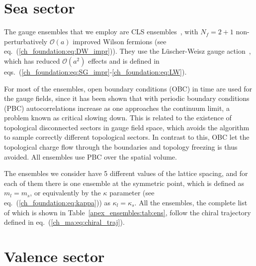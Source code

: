 
\section{Sea sector}
\label{ch_ma:sec:Sea}

The gauge ensembles that we employ are CLS ensembles~\citep{Bruno:2014jqa},\citep{Mohler:2017wnb} with $N_f=2+1$ non-perturbatively $\mathcal{O}(a)$ improved Wilson fermions (see eq.~(\ref{ch_foundation:eq:DW_impr})). They use the Lüscher-Weisz gauge action~\citep{Luscher:1985zq}, which has reduced $\mathcal{O}(a^2)$ effects and is defined in eqs.~(\ref{ch_foundation:eq:SG_impr}-\ref{ch_foundation:eq:LW}).

For most of the ensembles, open boundary conditions (OBC) in time are used for the gauge fields, since it has been shown that with periodic boundary conditions (PBC) autocorrelations increase as one approaches the continuum limit, a problem known as critical slowing down. This is related to the existence of topological disconnected sectors in gauge field space, which avoids the algorithm to sample correctly different topological sectors. In contrast to this, OBC let the topological charge flow through the boundaries and topology freezing is thus avoided. All ensembles use PBC over the spatial volume.

The ensembles we consider have 5 different values of the lattice spacing, and for each of them there is one ensemble at the symmetric point, which is defined as $m_l=m_s$, or equivalently by the $\kappa$ parameter (see eq.~(\ref{ch_foundation:eq:kappa})) as $\kappa_l=\kappa_s$. All the ensembles, the complete list of which is shown in Table~\ref{apex_ensembles:tab:ens}, follow the chiral trajectory defined in eq.~(\ref{ch_ma:eq:chiral_traj}).




\section{Valence sector}
\label{ch_ma:sec:Valence}

